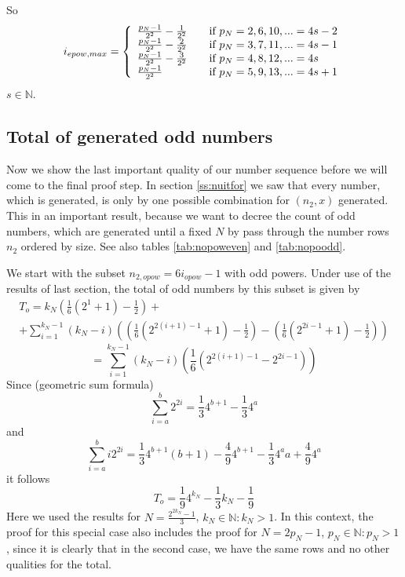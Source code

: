 \documentclass{aomart}
\theoremstyle{definition}
\begin{document}
So
\begin{equation} i_{epow,max} = \left\{
	\begin{array}{l@{\quad \quad}l}
	\frac{p_{N}-1}{2^{2}} - \frac{1}{2^{2}} & \textnormal{if $p_{N} = 2,6,10,... = 4s-2$} \\
	\frac{p_{N}-1}{2^{2}} - \frac{2}{2^{2}} & \textnormal{if $p_{N} = 3,7,11,... = 4s-1$} \\
	\frac{p_{N}-1}{2^{2}} - \frac{3}{2^{2}} & \textnormal{if $p_{N} = 4,8,12,... = 4s$} \\
	\frac{p_{N}-1}{2^{2}} & \textnormal{if $p_{N} = 5,9,13,... = 4s+1$}
	\end{array}
\right. \label{eq:iepowmaxcases} \end{equation} 
$s \in \mathbb{N}$.
\subsection{Total of generated odd numbers}
\label{ss:totnum}
Now we show the last important quality of our number sequence before we will come to the final proof step. In section \ref{ss:nuitfor} we saw that every number, which is generated, is only by one possible combination for $(n_{2},x)$ generated. This in an important result, because we want to decree the count of odd numbers, which are generated until a fixed $N$ by pass through the number rows $n_{2}$ ordered by size. See also tables \ref{tab:nopoweven} and \ref{tab:nopoodd}.

We start with the subset $n_{2,opow} = 6i_{opow} - 1$ with odd powers. Under use of the results of last section, the total of odd numbers by this subset is given by
\begin{multline*} T_{o} = k_{N} \left( \frac{1}{6} \left( 2^{1}+1 \right) - \frac{1}{2} \right) + \\
+ \sum_{i=1}^{k_{N}-1} \left( k_{N} - i \right) \left( \left( \frac{1}{6} \left( 2^{2(i+1)-1} + 1 \right) - \frac{1}{2} \right) - \left( \frac{1}{6} \left( 2^{2i-1} + 1 \right) - \frac{1}{2} \right) \right) \end{multline*}
\[ = \sum_{i=1}^{k_{N}-1} \left( k_{N}-i \right) \left( \frac{1}{6} \left( 2^{2(i+1)-1} - 2^{2i-1} \right) \right) \]
Since (geometric sum formula)
\begin{equation}\label{eq:sum2}
	\sum_{i=a}^{b} 2^{2i} = \frac{1}{3}4^{b+1} - \frac{1}{3} 4^{a}
\end{equation}
and
\begin{equation}\label{eq:sumi2}
	\sum_{i=a}^{b} i2^{2i} = \frac{1}{3} 4^{b+1} \left( b+1 \right) - \frac{4}{9} 4^{b+1} - \frac{1}{3} 4^{a} a + \frac{4}{9} 4^{a}
\end{equation}	
it follows
\begin{equation}\label{eq:totodd}
	T_{o} = \frac{1}{9} 4^{k_{N}} - \frac{1}{3} k_{N} - \frac{1}{9}
\end{equation}
Here we used the results for $N = \frac{2^{2k_{N}}-1}{3}$, $k_{N} \in \mathbb{N}: k_{N} > 1$. In this context, the proof for this special case also includes the proof for $N=2p_{N}-1$, $p_{N} \in \mathbb{N}:p_{N} > 1$, since it is clearly that in the second case, we have the same rows and no other qualities for the total.
\end{document}

